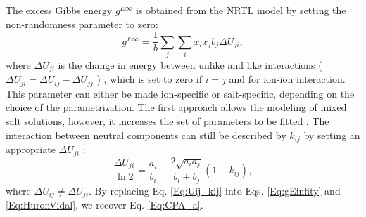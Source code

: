 The excess Gibbs energy $g^{E\infty}$ is obtained from the NRTL model by setting the non-randomness parameter to zero:
\begin{equation}
     g^{E\infty} = \frac{1}{b} \sum_j \sum_i x_ix_jb_j\Delta U_{ji},
    \label{Eq:gEinfity}
\end{equation}
where $\Delta U_{ji}$ is the change in energy between unlike and like interactions ($\Delta U_{ji} = \Delta U_{ij} - \Delta U_{jj}$ ) \cite{Maribo2015}, which is set to zero if $i=j$ and for ion-ion interaction. This parameter can either be made ion-specific or salt-specific, depending on the choice of the parametrization. The first approach allows the modeling of mixed salt solutions, however, it increases the set of parameters to be fitted \cite{Olsen2021}. The interaction between neutral components can still be described by $k_{ij}$ by setting an appropriate  $\Delta U_{ji}$ \cite{Michelsen2004}:
\begin{equation}
     \frac{\Delta U_{ji}}{\ln{2} } = \frac{a_i}{b_i} - \frac{2\sqrt{a_ia_j}}{b_i+b_j} \left (1-k_{ij} \right ),
    \label{Eq:Uij_kij}
\end{equation}
where
$\Delta U_{ij} \neq \Delta U_{ji}$. 
By replacing Eq. \eqref{Eq:Uij_kij} into Eqs. \eqref{Eq:gEinfity} and \eqref{Eq:HuronVidal}, we recover Eq. \eqref{Eq:CPA_a}.

